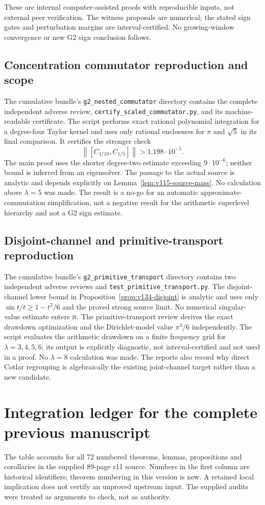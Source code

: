\documentclass[11pt]{article}
\theoremstyle{remark}
\newcommand{\norm}[1]{\left\lVert #1\right\rVert}
\begin{document}
These are internal computer-assisted proofs with reproducible inputs,
not external peer verification. The witness proposals are numerical;
the stated sign gates and perturbation margins are interval-certified.
No growing-window convergence or new G2 sign conclusion follows.

\subsection*{Concentration commutator reproduction and scope}
The cumulative bundle's \texttt{g2\_nested\_commutator} directory
contains the complete independent adverse review,
\texttt{certify\_scaled\_commutator.py}, and its machine-readable
certificate.  The script performs exact rational polynomial integration
for a degree-four Taylor kernel and uses only rational enclosures for
$\pi$ and $\sqrt5$ in its final comparison.  It certifies the stronger
check
\[
 \norm{[C_{1/10},C_{1/5}]}>1.198\cdot10^{-5}.
\]
The main proof uses the shorter degree-two estimate exceeding
$9\cdot10^{-6}$; neither bound is inferred from an eigensolver.  The
passage to the actual source is analytic and depends explicitly on
Lemma~\ref{lem:v115-source-mass}.  No calculation above
$\lambda=5$ was made.  The result is a no-go for an automatic
approximate-commutation simplification, not a negative result for the
arithmetic superlevel hierarchy and not a G2 sign estimate.

\subsection*{Disjoint-channel and primitive-transport reproduction}
The cumulative bundle's \texttt{g2\_primitive\_transport} directory
contains two independent adverse reviews and
\texttt{test\_primitive\_transport.py}.  The disjoint-channel lower
bound in Proposition~\ref{prop:v134-disjoint} is analytic and uses only
$\sin t/t\ge1-t^2/6$ and the proved strong source limit.  No numerical
singular-value estimate enters it.  The primitive-transport review
derives the exact drawdown optimization and the Dirichlet-model value
$\pi^3/6$ independently.  The script evaluates the arithmetic drawdown
on a finite frequency grid for $\lambda=3,4,5,6$; its output is explicitly
diagnostic, not interval-certified and not used in a proof.  No
$\lambda=8$ calculation was made.  The reports also record why direct
Cotlar regrouping is algebraically the existing joint-channel target
rather than a new candidate.


\section{Integration ledger for the complete previous manuscript}\label{app:ledger}
The table accounts for all 72 numbered theorems, lemmas, propositions and
corollaries in the supplied 89-page r11 source. Numbers in the first column
are historical identifiers; theorem numbering in this version is new.
A retained local implication does not certify an unproved upstream input.
The supplied audits were treated as arguments to check, not as authority.
\end{document}
